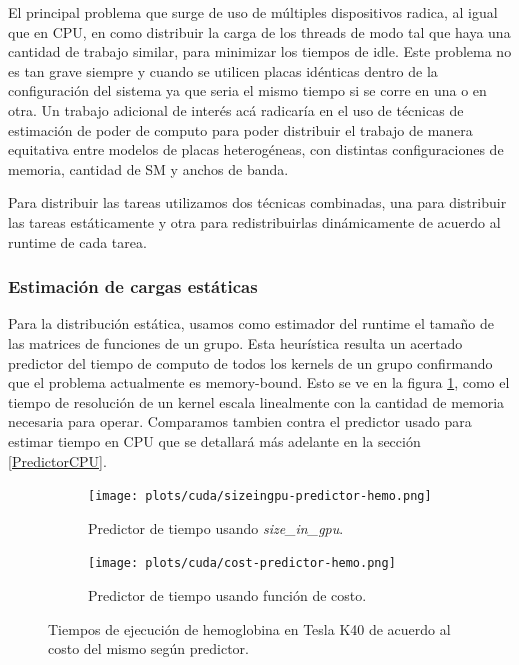 El principal problema que surge de uso de m\'ultiples dispositivos radica, al igual que en
CPU, en como distribuir la carga de los threads de modo tal que haya una cantidad de trabajo
similar, para minimizar los tiempos de idle. Este problema no es tan grave siempre y cuando
se utilicen placas id\'enticas dentro de la configuraci\'on del sistema ya que seria
el mismo tiempo si se corre en una o en otra. Un trabajo adicional de inter\'es ac\'a
radicar\'ia en el uso de t\'ecnicas de estimaci\'on de poder de computo para poder
distribuir el trabajo de manera equitativa entre modelos de placas heterog\'eneas, con distintas
configuraciones de memoria, cantidad de SM y anchos de banda.

Para distribuir las tareas utilizamos dos t\'ecnicas combinadas, una para distribuir las
tareas est\'aticamente y otra para redistribuirlas din\'amicamente de acuerdo al runtime de
cada tarea.


\subsubsection{Estimaci\'on de cargas est\'aticas}
Para la distribuci\'on est\'atica, usamos como estimador del runtime el tama\~no
de las matrices de funciones de un grupo. Esta heur\'istica resulta un acertado predictor
del tiempo de computo de todos los
kernels de un grupo confirmando que el problema actualmente es memory-bound. Esto se ve en la figura
\ref{fig:runtime-predictor}, como el tiempo de resoluci\'on de un kernel escala linealmente con
la cantidad de memoria necesaria para operar. Comparamos tambien contra el predictor usado
para estimar tiempo en CPU que se detallar\'a m\'as adelante en la secci\'on \ref{PredictorCPU}.

\begin{figure}[htbp]
   \centering
   \begin{subfigure}[b]{\plotwidthtres}
    \texttt{[image: plots/cuda/sizeingpu-predictor-hemo.png]}
     \caption{Predictor de tiempo usando \textit{size\_in\_gpu}.}
   \end{subfigure}
   \begin{subfigure}[b]{\plotwidthtres}
    \texttt{[image: plots/cuda/cost-predictor-hemo.png]}
     \caption{Predictor de tiempo usando funci\'on de costo.}
   \end{subfigure}
   \caption{Tiempos de ejecuci\'on de hemoglobina en Tesla K40 de acuerdo al costo del mismo seg\'un predictor.}
   \label{fig:runtime-predictor}
\end{figure}


